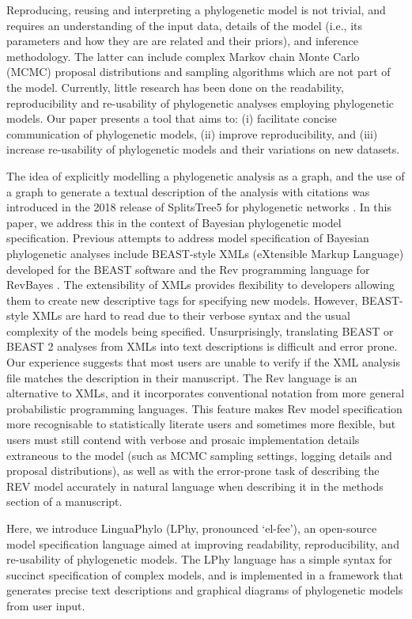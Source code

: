 \documentclass[10pt,letterpaper,table]{article}
\begin{document}
Reproducing, reusing and interpreting a phylogenetic model is not trivial, and requires an understanding of the input data, details of the model (i.e., its parameters and how they are are related and their priors), and inference methodology. 
The latter can include complex Markov chain Monte Carlo (MCMC) proposal distributions and sampling algorithms which are not part of the model.
Currently, little research has been done on the readability, reproducibility and re-usability of phylogenetic analyses employing phylogenetic models. 
Our paper presents a tool that aims to: (i) facilitate concise communication of phylogenetic models, (ii) improve reproducibility, and (iii) increase re-usability of phylogenetic models and their variations on new datasets. 

The idea of explicitly modelling a phylogenetic analysis as a graph, and the use of a graph to generate a textual description of the analysis with citations was introduced in the 2018 release of SplitsTree5 for phylogenetic networks \cite{huson2006application}. 
In this paper, we address this in the context of Bayesian phylogenetic model specification. 
Previous attempts to address model specification of Bayesian phylogenetic analyses include BEAST-style XMLs (eXtensible Markup Language) developed for the BEAST software \cite{beast,beast2} and the Rev programming language for RevBayes \cite{revbayes}. 
The extensibility of XMLs provides flexibility to developers allowing them to create new descriptive tags for specifying new models.
However, BEAST-style XMLs are hard to read due to their verbose syntax and the usual complexity of the models being specified. 
Unsurprisingly, translating BEAST or BEAST 2 analyses from XMLs into text descriptions is difficult and error prone. Our experience suggests that most users are unable to verify if the XML analysis file matches the description in their manuscript.
The Rev language \cite{revbayes} is an alternative to XMLs, and it incorporates conventional notation from more general probabilistic programming languages. 
This feature makes Rev model specification more recognisable to statistically literate users and sometimes more flexible, but users must still contend with verbose and prosaic implementation 
details extraneous to the model
(such as MCMC sampling settings, logging details and proposal distributions), as well as with the error-prone task of describing the REV model accurately in natural language when describing it in the methods section of a manuscript.
 
Here, we introduce LinguaPhylo (LPhy, pronounced `el-fee'), an open-source model specification 
language aimed at improving readability, reproducibility, and re-usability of phylogenetic models. 
The LPhy language has a simple syntax for succinct specification of complex models, and is implemented in a framework that generates precise text descriptions and graphical diagrams of phylogenetic models from user input.
\end{document}
